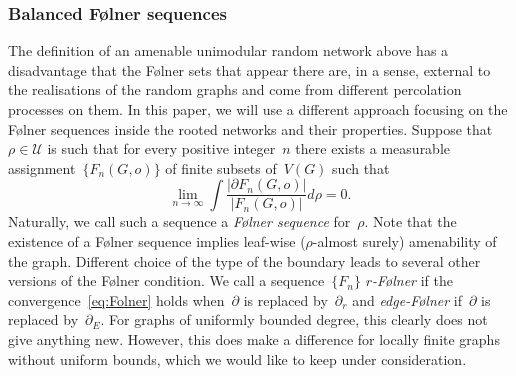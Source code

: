 \documentclass[10pt,a4paper]{amsart}
\begin{document}
\subsubsection{Balanced F\o lner sequences}

The definition of an amenable unimodular random network above has a disadvantage that the F\o lner sets that appear there are, in a sense, external to the realisations of the random graphs and come from different percolation processes on them. In this paper, we will use a different approach focusing on the F\o lner sequences inside the rooted networks and their properties.
Suppose that $\rho \in \mathcal{U}$ is such that for every positive integer~$n$ there exists a measurable assignment~$\{F_n(G,o)\}$ of finite subsets of~$V(G)$ such that 
\begin{equation}\label{eq:Folner}
    \lim_{n \to \infty} \int \frac{|\partial F_n (G,o)|}{|F_n(G,o)|} d\rho= 0.
\end{equation}
Naturally, we call such a sequence a \emph{F\o lner sequence} for~$\rho$. Note that the existence of a F\o lner sequence implies leaf-wise ($\rho$-almost surely) amenability of the graph. 
Different choice of the type of the boundary leads to several other versions of the F\o lner condition. We call a sequence~$\{F_n\}$ \emph{$r$-F\o lner} if the convergence~\eqref{eq:Folner} holds when~$\partial$ is replaced by~$\partial_r$ and \emph{edge-F\o lner} if~$\partial$ is replaced by~$\partial_E$. 
For graphs of uniformly bounded degree, this clearly does not give anything new. However, this does make a difference for locally finite graphs without uniform bounds, which we would like to keep under consideration.
\end{document}
